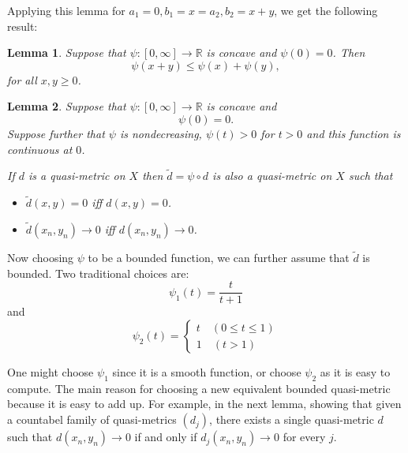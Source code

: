 \documentclass{article} %
\newtheorem{lemma}{Lemma}
\begin{document}
Applying this lemma for $a_1 =0, b_1=x = a_2, b_2=x+y$, we get the following result:
\begin{lemma}
    Suppose that $\psi \colon [0,\infty] \to \mathbb{R}$ is concave and $\psi(0)=0$. Then
    \[ \psi(x+y) \le \psi(x) + \psi(y),\]
    for all $x,y \ge 0$.
\end{lemma}
\begin{lemma}
    Suppose that $\psi \colon [0,\infty] \to \mathbb{R}$ is concave and
    \[\psi(0)=0.\]
    Suppose further that $\psi$ is nondecreasing, $\psi(t) >0$ for $t >0$ and this function is continuous at $0$.

    If $d$ is a quasi-metric on $X$ then $\tilde{d} = \psi \circ d$ is also a quasi-metric on $X$
    such that
    \begin{itemize}
        \item $\tilde{d}(x,y)=0$ iff $d(x,y)=0$.
        \item $\tilde{d}(x_n,y_n) \to 0$ iff $d(x_n,y_n) \to 0$.
    \end{itemize}
\end{lemma}
Now choosing $\psi$ to be a bounded function, we can further assume that $\tilde{d}$ is bounded. Two traditional choices are:
\[ \psi_1(t)= \dfrac{t}{t+1}\]
and
\[\psi_2(t) = \begin{cases}
        t \quad (0 \le t \le 1) \\
        1 \quad (t >1)
    \end{cases}\]

One might choose $\psi_1$ since it is a smooth function, or choose $\psi_2$ as it is easy to compute.
The main reason for choosing a new equivalent bounded quasi-metric because it is easy to add up.
For example, in the next lemma, showing that given a countabel family of quasi-metrics $(d_j)$, there exists a single quasi-metric $d$
such that $d(x_n,y_n) \to 0$  if and only if $d_j(x_n,y_n) \to 0$ for every $j$.
\end{document}
